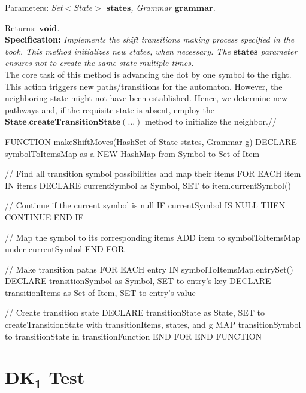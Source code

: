 Parameters: \textit{Set\(<\)State\(>\) \(\boldsymbol{states}\), Grammar \(\boldsymbol{grammar}\).}

Returns: \textit{\(\boldsymbol{void}\).}\\

\textbf{Specification:} \textit{Implements the shift transitions making process specified in the book. This method initializes new states, when necessary. The \(\boldsymbol{states}\) parameter ensures not to create the same state multiple times.}\\

The core task of this method is advancing the dot by one symbol to the right. This action triggers new paths/transitions for the automaton. However, the neighboring state might not have been established. Hence, we determine new pathways and, if the requisite state is absent, employ the \(\boldsymbol{State.createTransitionState(...)}\) method to initialize the neighbor.//

\begin{codeblock}
    FUNCTION makeShiftMoves(HashSet of State states, Grammar g)
    DECLARE symbolToItemsMap as a NEW HashMap from Symbol to Set of Item

    // Find all transition symbol possibilities and map their items
    FOR EACH item IN items
    DECLARE currentSymbol as Symbol, SET to item.currentSymbol()

    // Continue if the current symbol is null
    IF currentSymbol IS NULL THEN
    CONTINUE
    END IF

    // Map the symbol to its corresponding items
    ADD item to symbolToItemsMap under currentSymbol
    END FOR

    // Make transition paths
    FOR EACH entry IN symbolToItemsMap.entrySet()
    DECLARE transitionSymbol as Symbol, SET to entry's key
    DECLARE transitionItems as Set of Item, SET to entry's value

    // Create transition state
    DECLARE transitionState as State, SET to createTransitionState with transitionItems, states, and g
    MAP transitionSymbol to transitionState in transitionFunction
    END FOR
    END FUNCTION
\end{codeblock}

\newpage


\section{\(\boldsymbol{DK_{1}}\) Test}\label{sec:DK1 Test}


